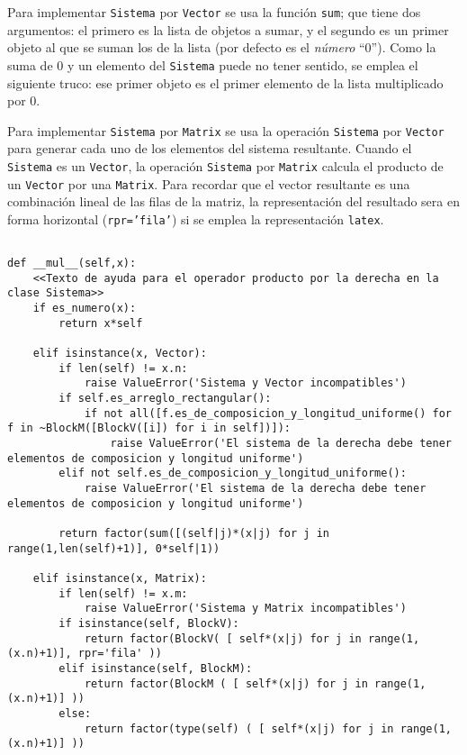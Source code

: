 \documentclass[11pt]{report}
\begin{document}
Para implementar \texttt{Sistema} por \texttt{Vector} se usa la función \texttt{sum}; que
tiene dos argumentos: el primero es la lista de objetos a sumar, y el
segundo es un primer objeto al que se suman los de la lista (por
defecto es el \emph{número} ``\(0\)''). Como la suma de \(0\) y un
elemento del \texttt{Sistema} puede no tener sentido, se emplea el siguiente
truco: ese primer objeto es el primer elemento de la lista
multiplicado por \(0\).

Para implementar \texttt{Sistema} por \texttt{Matrix} se usa la operación \texttt{Sistema}
por \texttt{Vector} para generar cada uno de los elementos del sistema
resultante. Cuando el \texttt{Sistema} es un \texttt{Vector}, la operación \texttt{Sistema}
por \texttt{Matrix} calcula el producto de un \texttt{Vector} por una \texttt{Matrix}. Para
recordar que el vector resultante es una combinación lineal de las
filas de la matriz, la representación del resultado sera en forma
horizontal (\texttt{rpr='fila'}) si se emplea la representación \texttt{latex}.

\begin{verbatim}

def __mul__(self,x):
    <<Texto de ayuda para el operador producto por la derecha en la clase Sistema>>
    if es_numero(x):
        return x*self

    elif isinstance(x, Vector):
        if len(self) != x.n:
            raise ValueError('Sistema y Vector incompatibles')
        if self.es_arreglo_rectangular():
            if not all([f.es_de_composicion_y_longitud_uniforme() for f in ~BlockM([BlockV([i]) for i in self])]):
                raise ValueError('El sistema de la derecha debe tener elementos de composicion y longitud uniforme')
        elif not self.es_de_composicion_y_longitud_uniforme():
            raise ValueError('El sistema de la derecha debe tener elementos de composicion y longitud uniforme')
            
        return factor(sum([(self|j)*(x|j) for j in range(1,len(self)+1)], 0*self|1))
    
    elif isinstance(x, Matrix):
        if len(self) != x.m:
            raise ValueError('Sistema y Matrix incompatibles')
        if isinstance(self, BlockV):
            return factor(BlockV( [ self*(x|j) for j in range(1,(x.n)+1)], rpr='fila' ))
        elif isinstance(self, BlockM):
            return factor(BlockM ( [ self*(x|j) for j in range(1,(x.n)+1)] ))
        else:
            return factor(type(self) ( [ self*(x|j) for j in range(1,(x.n)+1)] ))

\end{verbatim}
\end{document}
